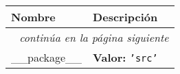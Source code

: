     \vspace{-1cm}
\hspace{\varindent}\begin{longtable}{|p{\varnamewidth}|p{\vardescrwidth}|l}
\cline{1-2}
\cline{1-2} \centering \textbf{Nombre} & \centering \textbf{Descripción}& \\
\cline{1-2}
\endhead\cline{1-2}\multicolumn{3}{r}{\small\textit{continúa en la página siguiente}}\\\endfoot\cline{1-2}
\endlastfoot\raggedright \_\-\_\-p\-a\-c\-k\-a\-g\-e\-\_\-\_\- & \raggedright \textbf{Valor:} 
{\tt \texttt{'}\texttt{src}\texttt{'}}&\\
\cline{1-2}
\end{longtable}

